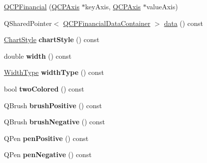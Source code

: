 \begin{DoxyCompactItemize}
\item 
\hyperlink{class_q_c_p_financial_a4702d5248feeb9d1ec6e3ce725b10b32}{Q\+C\+P\+Financial} (\hyperlink{class_q_c_p_axis}{Q\+C\+P\+Axis} $\ast$key\+Axis, \hyperlink{class_q_c_p_axis}{Q\+C\+P\+Axis} $\ast$value\+Axis)
\item 
Q\+Shared\+Pointer$<$ \hyperlink{class_q_c_p_data_container}{Q\+C\+P\+Financial\+Data\+Container} $>$ \hyperlink{class_q_c_p_financial_ad37e283817eff038a05ccba7ae22a630}{data} () const 
\item 
\hyperlink{class_q_c_p_financial_a0f800e21ee98d646dfc6f8f89d10ebfb}{Chart\+Style} {\bfseries chart\+Style} () const \hypertarget{class_q_c_p_financial_a0888c9308cc5fcb4daa70184f9582412}{}\label{class_q_c_p_financial_a0888c9308cc5fcb4daa70184f9582412}

\item 
double {\bfseries width} () const \hypertarget{class_q_c_p_financial_a71ccaa04cdade0ec08a2117db6e4a4ce}{}\label{class_q_c_p_financial_a71ccaa04cdade0ec08a2117db6e4a4ce}

\item 
\hyperlink{class_q_c_p_financial_aef1761dda71a53dc5269685e9e492626}{Width\+Type} {\bfseries width\+Type} () const \hypertarget{class_q_c_p_financial_a25f86eaa756b12655af0f45d0e1e7168}{}\label{class_q_c_p_financial_a25f86eaa756b12655af0f45d0e1e7168}

\item 
bool {\bfseries two\+Colored} () const \hypertarget{class_q_c_p_financial_a2bab30fc4eee38a0da3a05846b8d7ac7}{}\label{class_q_c_p_financial_a2bab30fc4eee38a0da3a05846b8d7ac7}

\item 
Q\+Brush {\bfseries brush\+Positive} () const \hypertarget{class_q_c_p_financial_acb69536a334fae7fc31b2bfd4eca81f5}{}\label{class_q_c_p_financial_acb69536a334fae7fc31b2bfd4eca81f5}

\item 
Q\+Brush {\bfseries brush\+Negative} () const \hypertarget{class_q_c_p_financial_a91e09b31ce341c17b917e77fdc68d84e}{}\label{class_q_c_p_financial_a91e09b31ce341c17b917e77fdc68d84e}

\item 
Q\+Pen {\bfseries pen\+Positive} () const \hypertarget{class_q_c_p_financial_a544899bde79d06e17ccefcb9926d87ce}{}\label{class_q_c_p_financial_a544899bde79d06e17ccefcb9926d87ce}

\item 
Q\+Pen {\bfseries pen\+Negative} () const \hypertarget{class_q_c_p_financial_a557fe911aa04f70c1734c8fa09994148}{}\label{class_q_c_p_financial_a557fe911aa04f70c1734c8fa09994148}


\end{DoxyCompactItemize}
